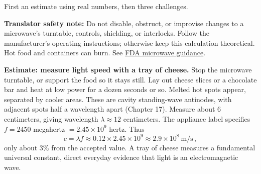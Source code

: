 First an estimate using real numbers, then three challenges.

\textbf{Translator safety note:} Do not disable, obstruct, or improvise changes to a microwave's turntable, controls, shielding, or interlocks. Follow the manufacturer's operating instructions; otherwise keep this calculation theoretical. Hot food and containers can burn. See \href{https://www.fda.gov/radiation-emitting-products/resources-you-radiation-emitting-products/microwave-ovens}{FDA microwave guidance}.

\textbf{Estimate: measure light speed with a tray of cheese.} Stop the microwave turntable, or support the food so it stays still. Lay out cheese slices or a chocolate bar and heat at low power for a dozen seconds or so. Melted hot spots appear, separated by cooler areas. These are cavity standing-wave antinodes, with adjacent spots half a wavelength apart (Chapter 17). Measure about 6 centimeters, giving wavelength $\lambda\approx 12$ centimeters. The appliance label specifies $f=2450$ megahertz $=2.45\times10^{9}$ hertz. Thus
\[
  c=\lambda f\approx 0.12\times 2.45\times10^{9}\approx 2.9\times10^{8}\ \text{m/s}\,,
\]
only about $3\%$ from the accepted value. A tray of cheese measures a fundamental universal constant, direct everyday evidence that light is an electromagnetic wave.

